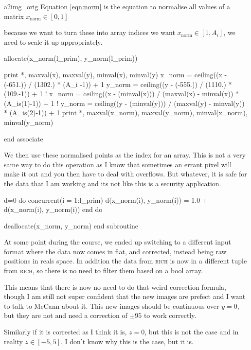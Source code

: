 \documentclass[10pt, a4paper]{article}
\begin{document}
\begin{codeblock}{a2img_orig}
Equation \eqref{eqn:norm} is the equation to normalise all values of a matrix $x_\text{norm} \in [0, 1]$

because we want to turn these into array indices we want $x_\text{norm} \in [1, A_i]$, we need to scale it up appropriately.

\begin{code}
		allocate(x_norm(l_prim), y_norm(l_prim))
		
		print *, maxval(x), maxval(y), minval(x), minval(y)
		x_norm = ceiling((x - (-651.)) / (1302.) * (A_i -1)) + 1 
		y_norm = ceiling((y - (-555.)) / (1110.) * (109.-1)) + 1
! 		x_norm = ceiling((x - (minval(x))) / (maxval(x) - minval(x)) * (A_is(1)-1)) + 1 
! 		y_norm = ceiling((y - (minval(y))) / (maxval(y) - minval(y)) * (A_is(2)-1)) + 1
		print *, maxval(x_norm), maxval(y_norm), minval(x_norm), minval(y_norm)
	
	end associate
\end{code}

We then use these normalised points as the index for an array. This is not a very same way to do this operation as I know that sometimes an errant pixel will make it out and you then have to deal with overflows. But whatever, it is safe for the data that I am working and its not like this is a security application.  

\begin{code}
	d=0
	do concurrent(i = 1:l_prim)
		d(x_norm(i), y_norm(i)) = 1.0 + d(x_norm(i), y_norm(i))
	end do
	
	deallocate(x_norm, y_norm)
end subroutine
\end{code}
\end{codeblock}

At some point during the course, we ended up switching to a different input format where the data now comes in flat, and corrected, instead being raw positions in reals space. 
In addition the data from \textsc{rich} is now in a different tuple from \textsc{rich}, so there is no need to filter them based on a bool array.

This means that there is now no need to do that weird correction formula, though I am still not super confident that the new images are prefect and I want to talk to McCann about it. 
This new images should be continuous over $y=0$, but they are not and need a correction of $\pm 95$ to work correctly. 

Similarly if it is corrected as I think it is, $z=0$, but this is not the case and in reality $z\in[-5,5]$. I don't know why this is the case, but it is. 
\end{document}
